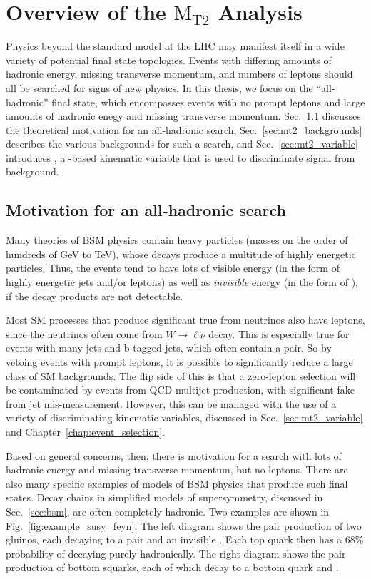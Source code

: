 \chapter{Overview of the \texorpdfstring{$\text{M}_\text{T2}$}{MT2} Analysis}

Physics beyond the standard model at the LHC may manifest itself in a wide variety of potential final state 
topologies. Events with differing amounts of hadronic energy, missing transverse momentum, and numbers of leptons
should all be searched for signs of new physics. In this thesis, we focus on the ``all-hadronic'' final state,
which encompasses events with no prompt leptons and large amounts of hadronic enegy and missing transverse momentum.
Sec.~\ref{sec:motivation} discusses the theoretical motivation for an all-hadronic search, Sec.~\ref{sec:mt2_backgrounds}
describes the various backgrounds for such a search, and Sec.~\ref{sec:mt2_variable} introduces \mttwo, a \ptmiss-based kinematic
variable that is used to discriminate signal from background.

\section{Motivation for an all-hadronic search}
\label{sec:motivation}

Many theories of BSM physics contain heavy particles (masses on the order of hundreds of GeV to TeV), whose
decays produce a multitude of highly energetic particles. Thus, the events tend to have lots of visible
energy (in the form of highly energetic jets and/or leptons) as well as
\emph{invisible} energy (in the form of \ptmiss), if the decay products are not detectable.

Most SM processes that produce significant true \ptmiss from neutrinos also have leptons, since the
neutrinos often come from $W\to\ell\nu$ decay. This is especially true for events with many jets
and b-tagged jets, which often contain a \ttbar pair. So by vetoing events with prompt leptons, it is
possible to significantly reduce a large class of SM backgrounds. The flip side of this is that a
zero-lepton selection will be contaminated by events from QCD multijet production, with significant
fake \ptmiss from jet mis-measurement. However, this can be managed with the use of a variety of
discriminating kinematic variables, discussed in Sec.~\ref{sec:mt2_variable} and Chapter~\ref{chap:event_selection}.

Based on general concerns, then, there is motivation for a search with lots of hadronic energy and
missing transverse momentum, but no leptons. There are also many specific examples of models
of BSM physics that produce such final states. Decay chains in simplified models of supersymmetry, discussed in
Sec.~\ref{sec:bsm}, are often completely hadronic. Two examples are shown in Fig.~\ref{fig:example_susy_feyn}.
The left diagram shows the pair production of two gluinos, each decaying to a \ttbar pair and an invisible \lsp.
Each top quark then has a 68\% probability of decaying purely hadronically. The right diagram shows
the pair production of bottom squarks, each of which decay to a bottom quark and \lsp.

